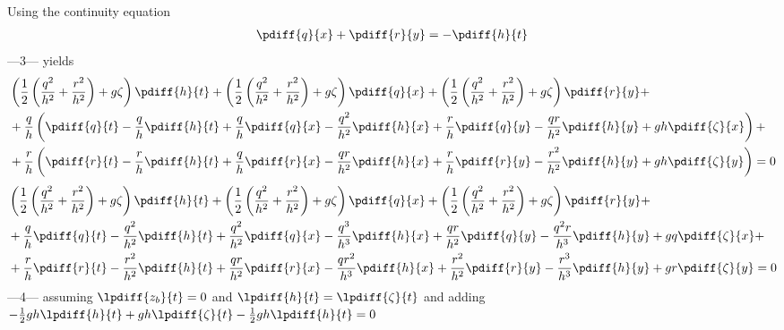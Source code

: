 Using the continuity equation
\begin{align}
    \pdiff{q}{x} + \pdiff{r}{y} = -\pdiff{h}{t}
\end{align}
---3--- yields
\begin{align}
    & \left( \half \left( \frac{q^2}{h^2} + \frac{r^2}{h^2} \right)+ g\zeta  \right) \pdiff{h}{t}
    + \left( \half \left( \frac{q^2}{h^2} + \frac{r^2}{h^2} \right)+ g\zeta  \right) \pdiff{q}{x}
    + \left( \half \left( \frac{q^2}{h^2} + \frac{r^2}{h^2} \right)+ g\zeta  \right) \pdiff{r}{y} +
    \\*
    &+ \frac{q}{h} \left(
    \pdiff{q}{t}
    - \frac{q}{h} \pdiff{h}{t} + \frac{q}{h}\pdiff{q}{x}
    - \frac{q^2}{h^2}\pdiff{h}{x} + \frac{r}{h}\pdiff{q}{y}
    - \frac{qr}{h^2}\pdiff{h}{y}
    + g h \pdiff{\zeta}{x} \right) +
    \\*
    &+ \frac{r}{h} \left(
    \pdiff{r}{t}
    - \frac{r}{h} \pdiff{h}{t}
    + \frac{q}{h}\pdiff{r}{x} - \frac{qr}{h^2}\pdiff{h}{x}
    + \frac{r}{h}\pdiff{r}{y} - \frac{r^2}{h^2}\pdiff{h}{y}
    + g h \pdiff{\zeta}{y} \right) = 0
\end{align}
\begin{align}
    & \left( \half \left( \frac{q^2}{h^2} + \frac{r^2}{h^2} \right)+ g\zeta  \right) \pdiff{h}{t}
    + \left( \half \left( \frac{q^2}{h^2} + \frac{r^2}{h^2} \right)+ g\zeta  \right) \pdiff{q}{x}
    + \left( \half \left( \frac{q^2}{h^2} + \frac{r^2}{h^2} \right)+ g\zeta  \right) \pdiff{r}{y} +
    \\*
    &+
    \frac{q}{h}\pdiff{q}{t}
    - \frac{q^2}{h^2}  \pdiff{h}{t} + \frac{q^2}{h^2}\pdiff{q}{x}
    - \frac{q^3}{h^3}  \pdiff{h}{x} + \frac{qr}{h^2}\pdiff{q}{y}
    - \frac{q^2r}{h^3} \pdiff{h}{y}
    + g q \pdiff{\zeta}{x} +
    \\*
    &+
    \frac{r}{h} \pdiff{r}{t}
    - \frac{r^2}{h^2} \pdiff{h}{t}
    + \frac{qr}{h^2}  \pdiff{r}{x} - \frac{qr^2}{h^3}\pdiff{h}{x}
    + \frac{r^2}{h^2} \pdiff{r}{y} - \frac{r^3}{h^3}\pdiff{h}{y}
    + g r \pdiff{\zeta}{y} = 0
\end{align}
---4---\newline
assuming $\lpdiff{z_b}{t}=0$ and $\lpdiff{h}{t} = \lpdiff{\zeta}{t}$ and \newline
adding $-\half gh \lpdiff{h}{t} + gh \lpdiff{\zeta}{t} -\half gh \lpdiff{h}{t} = 0$
